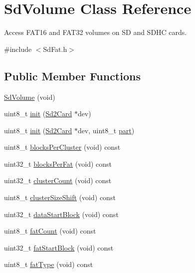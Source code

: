 \hypertarget{class_sd_volume}{}\section{Sd\+Volume Class Reference}
\label{class_sd_volume}


Access F\+A\+T16 and F\+A\+T32 volumes on S\+D and S\+D\+H\+C cards.  




{\ttfamily \#include $<$Sd\+Fat.\+h$>$}

\subsection*{Public Member Functions}
\begin{DoxyCompactItemize}
\item 
\hyperlink{class_sd_volume_a1843d58062920d6d0e122892ffa42923}{Sd\+Volume} (void)
\item 
uint8\+\_\+t \hyperlink{class_sd_volume_adfcf83cba537b831f3a993a058e7ca85}{init} (\hyperlink{class_sd2_card}{Sd2\+Card} $\ast$dev)
\item 
uint8\+\_\+t \hyperlink{class_sd_volume_a8f5879e458ea6f1a2a2a2b884d800550}{init} (\hyperlink{class_sd2_card}{Sd2\+Card} $\ast$dev, uint8\+\_\+t \hyperlink{_fat_structs_8h_aa65f87792f271fc6cfa70980af6ac3dd}{part})
\item 
uint8\+\_\+t \hyperlink{class_sd_volume_a1047c8b517712e20529e9ed089b09a63}{blocks\+Per\+Cluster} (void) const 
\item 
uint32\+\_\+t \hyperlink{class_sd_volume_afc18005b35a5177d1f4749c4fbe4bccb}{blocks\+Per\+Fat} (void) const 
\item 
uint32\+\_\+t \hyperlink{class_sd_volume_a6f666cb0c9b562dea3002747416dd2cb}{cluster\+Count} (void) const 
\item 
uint8\+\_\+t \hyperlink{class_sd_volume_a16e82740695d5183ae631f79bb9b5bb7}{cluster\+Size\+Shift} (void) const 
\item 
uint32\+\_\+t \hyperlink{class_sd_volume_a965f3446c805c8e6ae5a97a2228a9e37}{data\+Start\+Block} (void) const 
\item 
uint8\+\_\+t \hyperlink{class_sd_volume_adee126f68c12465b9eec2bab58e61234}{fat\+Count} (void) const 
\item 
uint32\+\_\+t \hyperlink{class_sd_volume_afe23dc12d0d62df95c879ec398741b88}{fat\+Start\+Block} (void) const 
\item 
uint8\+\_\+t \hyperlink{class_sd_volume_a5aefec18d8b66c55274973b45c33a43d}{fat\+Type} (void) const 

\end{DoxyCompactItemize}
